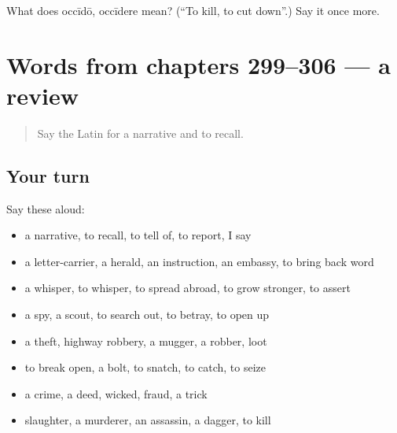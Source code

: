 \begin{tcolorbox}[breakable,colback=teal!4,colframe=teal!35!black,title={Before you move on}]
What does occīdō, occīdere mean? (\textquotedblleft{}To kill, to cut down\textquotedblright{}.) Say it once more.
\end{tcolorbox}
\section[(dialogue)]{Words from chapters 299–306 — a review}

\label{lesson:LA-R306-review-299-306}



\begin{quote}
Say the Latin for a narrative and to recall.
\end{quote}

\subsection*{Your turn}
Say these aloud:

\begin{itemize}
\raggedright
  \item a narrative, to recall, to tell of, to report, I say
  \item a letter-carrier, a herald, an instruction, an embassy, to bring back word
  \item a whisper, to whisper, to spread abroad, to grow stronger, to assert
  \item a spy, a scout, to search out, to betray, to open up
  \item a theft, highway robbery, a mugger, a robber, loot
  \item to break open, a bolt, to snatch, to catch, to seize
  \item a crime, a deed, wicked, fraud, a trick
  \item slaughter, a murderer, an assassin, a dagger, to kill
\end{itemize}

